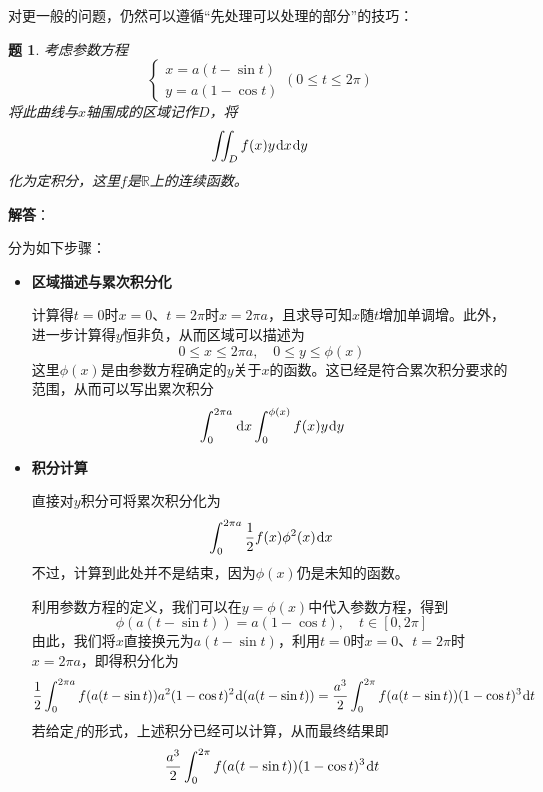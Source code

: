 \documentclass[a4paper,UTF8,fontset=windows,AutoFakeBold]{ctexart}
\newcommand*{\dr}{\hspace{0.07em}\mathrm{d}}
\newcommand*{\rb}{\mathbb{R}}
\theoremstyle{ex}
\newtheorem{exercise}{题}
\newcommand{\sol}[1]{{\vspace{5pt}\kaishu\noindent\textbf{解答}：\vspace{-3pt}
\begin{compactitem}
    \item[] #1
\end{compactitem}
}}
\begin{document}
对更一般的问题，仍然可以遵循``先处理可以处理的部分''的技巧：
\begin{framed}
\begin{exercise}
    考虑参数方程
    $$\begin{cases}x=a(t-\sin t)\\y=a(1-\cos t)\end{cases}(0\le t\le2\pi)$$
    将此曲线与$x$轴围成的区域记作$D$，将
    $$\iint_Df(x)y\dr x\dr y$$
    化为定积分，这里$f$是$\rb$上的连续函数。
\end{exercise}
\sol{
    分为如下步骤：
    \begin{itemize}
        \item \textbf{区域描述与累次积分化}
        
        计算得$t=0$时$x=0$、$t=2\pi$时$x=2\pi a$，且求导可知$x$随$t$增加单调增。此外，进一步计算得$y$恒非负，从而区域可以描述为
        $$0\le x\le2\pi a,\quad0\le y\le\phi(x)$$
        这里$\phi(x)$是由参数方程确定的$y$关于$x$的函数。这已经是符合累次积分要求的范围，从而可以写出累次积分
        $$\int_0^{2\pi a}\dr x\int_0^{\phi(x)}f(x)y\dr y$$

        \item \textbf{积分计算}
        
        直接对$y$积分可将累次积分化为
        $$\int_0^{2\pi a}\frac{1}{2}f(x)\phi^2(x)\dr x$$
        不过，计算到此处并不是结束，因为$\phi(x)$仍是未知的函数。

        利用参数方程的定义，我们可以在$y=\phi(x)$中代入参数方程，得到
        $$\phi(a(t-\sin t))=a(1-\cos t),\quad t\in[0,2\pi]$$
        由此，我们将$x$直接换元为$a(t-\sin t)$，利用$t=0$时$x=0$、$t=2\pi$时$x=2\pi a$，即得积分化为
        $$\frac{1}{2}\int_0^{2\pi a}f(a(t-\sin t))a^2(1-\cos t)^2\dr(a(t-\sin t))=\frac{a^3}{2}\int_0^{2\pi}f(a(t-\sin t))(1-\cos t)^3\dr t$$
        若给定$f$的形式，上述积分已经可以计算，从而最终结果即
        $$\frac{a^3}{2}\int_0^{2\pi}f(a(t-\sin t))(1-\cos t)^3\dr t$$
    \end{itemize}
}
\end{framed}
\end{document}
